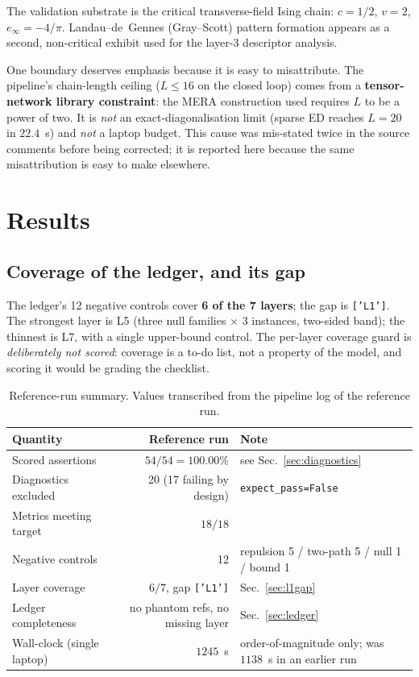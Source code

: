 \documentclass[11pt,a4paper]{article}
\newcommand{\code}[1]{\texttt{\small #1}}
\begin{document}
The validation substrate is the critical transverse-field Ising chain: $c = 1/2$,
$v = 2$, $e_\infty = -4/\pi$. Landau--de~Gennes (Gray--Scott) pattern formation
appears as a second, non-critical exhibit used for the layer-3 descriptor analysis.

One boundary deserves emphasis because it is easy to misattribute. The pipeline's
chain-length ceiling ($L \le 16$ on the closed loop) comes from a
\textbf{tensor-network library constraint}: the MERA construction used \cite{EvenblyVidal2009} requires $L$
to be a power of two. It is \emph{not} an exact-diagonalisation limit (sparse ED
reaches $L = 20$ in $22.4$~s) and \emph{not} a laptop budget. This cause was
mis-stated twice in the source comments before being corrected; it is reported here
because the same misattribution is easy to make elsewhere.

\section{Results}
\label{sec:results}

\subsection{Coverage of the ledger, and its gap}
\label{sec:gaps}

The ledger's 12 negative controls cover \textbf{6 of the 7 layers}; the gap is
\code{['L1']}. The strongest layer is L5 (three null families $\times$ 3 instances,
two-sided band); the thinnest is L7, with a single upper-bound control. The
per-layer coverage guard is \emph{deliberately not scored}: coverage is a to-do
list, not a property of the model, and scoring it would be grading the checklist.

\begin{table}[h]
\centering\small
\begin{tabular}{@{}lrl@{}}
\toprule
\textbf{Quantity} & \textbf{Reference run} & \textbf{Note} \\
\midrule
Scored assertions & $54/54 = 100.00\%$ & see Sec.~\ref{sec:diagnostics} \\
Diagnostics excluded & 20 (17 failing by design) & \code{expect\_pass=False} \\
Metrics meeting target & $18/18$ & \\
Negative controls & 12 & repulsion 5 / two-path 5 / null 1 / bound 1 \\
Layer coverage & $6/7$, gap \code{['L1']} & Sec.~\ref{sec:l1gap} \\
Ledger completeness & no phantom refs, no missing layer & Sec.~\ref{sec:ledger} \\
Wall-clock (single laptop) & $1245$~s & order-of-magnitude only; was $1138$~s in an earlier run \\
\bottomrule
\end{tabular}
\caption{Reference-run summary. Values transcribed from the pipeline log of the
reference run.}
\label{tab:summary}
\end{table}
\end{document}
